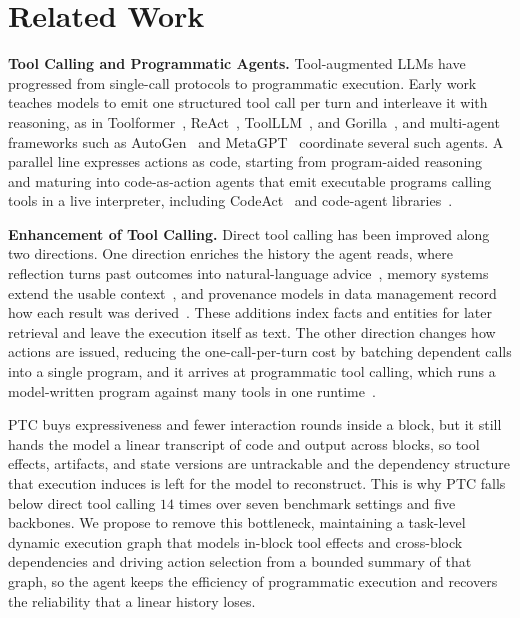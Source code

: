 \section{Related Work}

\textbf{Tool Calling and Programmatic Agents.}\quad
Tool-augmented LLMs have progressed from single-call protocols to programmatic execution.
Early work teaches models to emit one structured tool call per turn and interleave it with reasoning, as in Toolformer~\citep{schick2023toolformer}, ReAct~\citep{yao2023react}, ToolLLM~\citep{qin2024toolllm}, and Gorilla~\citep{patil2023gorilla}, and multi-agent frameworks such as AutoGen~\citep{wu2023autogen} and MetaGPT~\citep{hong2024metagpt} coordinate several such agents.
A parallel line expresses actions as code, starting from program-aided reasoning~\citep{gao2023pal,chen2023pot} and maturing into code-as-action agents that emit executable programs calling tools in a live interpreter, including CodeAct~\citep{wang2024codeact} and code-agent libraries~\citep{smolagents2025}.

\textbf{Enhancement of Tool Calling.}\quad
Direct tool calling has been improved along two directions.
One direction enriches the history the agent reads, where reflection turns past outcomes into natural-language advice~\citep{shinn2023reflexion,madaan2023selfrefine}, memory systems extend the usable context~\citep{packer2024memgpt,rasmussen2025zep,xu2025amem,sumers2024coala}, and provenance models in data management record how each result was derived~\citep{davidson2008provenance,herschel2017provenance}.
These additions index facts and entities for later retrieval and leave the execution itself as text.
The other direction changes how actions are issued, reducing the one-call-per-turn cost by batching dependent calls into a single program, and it arrives at programmatic tool calling, which runs a model-written program against many tools in one runtime~\citep{anthropic2025ptc}.

PTC buys expressiveness and fewer interaction rounds inside a block, but it still hands the model a linear transcript of code and output across blocks, so tool effects, artifacts, and state versions are untrackable and the dependency structure that execution induces is left for the model to reconstruct.
This is why PTC falls below direct tool calling $14$ times over seven benchmark settings and five backbones.
We propose \method to remove this bottleneck, maintaining a task-level dynamic execution graph that models in-block tool effects and cross-block dependencies and driving action selection from a bounded summary of that graph, so the agent keeps the efficiency of programmatic execution and recovers the reliability that a linear history loses.
